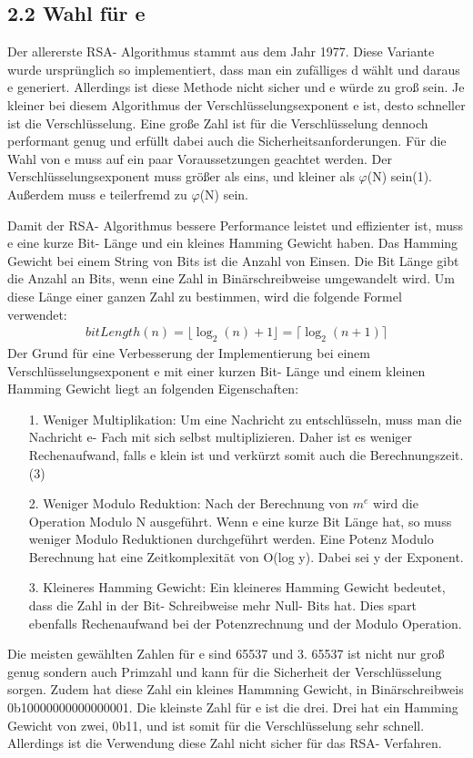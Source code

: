 \documentclass[course=asp]{aspdoc}
\begin{document}
\subsection*{2.2 Wahl für e }
Der allererste RSA- Algorithmus stammt aus dem Jahr 1977. Diese Variante wurde ursprünglich so implementiert, dass man ein zufälliges d wählt und daraus e generiert. Allerdings ist diese Methode nicht sicher und e würde zu groß sein. Je kleiner bei diesem Algorithmus der Verschlüsselungsexponent e ist, desto schneller ist die Verschlüsselung. Eine große Zahl ist für die Verschlüsselung dennoch performant genug und erfüllt dabei auch die Sicherheitsanforderungen. Für die Wahl von e muss auf ein paar Voraussetzungen geachtet werden. Der Verschlüsselungsexponent muss größer als eins, und kleiner als $\varphi $(N) sein(1). Außerdem muss e teilerfremd zu $\varphi $(N) sein.

Damit der RSA- Algorithmus bessere Performance leistet und effizienter ist, muss e eine kurze Bit- Länge und ein kleines Hamming Gewicht haben. Das Hamming Gewicht bei einem String von Bits ist die Anzahl von Einsen. Die Bit Länge gibt die Anzahl an Bits, wenn eine Zahl in Binärschreibweise umgewandelt wird. Um diese Länge einer ganzen Zahl zu bestimmen, wird die folgende Formel verwendet:
\begin{align}
	bitLength(n) = \lfloor \log_{2}(n) + 1 \rfloor = \lceil \log_{2}(n + 1)\rceil
\end{align}
Der Grund für eine Verbesserung der Implementierung bei einem Verschlüsselungsexponent e mit einer kurzen Bit- Länge und einem kleinen Hamming Gewicht liegt an folgenden Eigenschaften:
\begin{itemize}
 \item [1.] Weniger Multiplikation: Um eine Nachricht zu entschlüsseln, muss man die Nachricht e- Fach mit sich selbst multiplizieren. Daher ist es weniger Rechenaufwand, falls e klein ist und verkürzt somit auch die Berechnungszeit.(3)
 \item [2.] Weniger Modulo Reduktion: Nach der Berechnung von $m^{e}$ wird die Operation Modulo N ausgeführt. Wenn e eine kurze Bit Länge hat, so muss weniger Modulo Reduktionen durchgeführt werden. Eine Potenz Modulo Berechnung hat eine Zeitkomplexität von O(log y). Dabei sei y der Exponent.   
 \item [3.] Kleineres Hamming Gewicht: Ein kleineres Hamming Gewicht bedeutet, dass die Zahl in der Bit- Schreibweise mehr Null- Bits hat. Dies spart ebenfalls Rechenaufwand bei der Potenzrechnung und der Modulo Operation.
\end{itemize}
Die meisten gewählten Zahlen für e sind 65537 und 3. 65537 ist nicht nur groß genug sondern auch Primzahl und kann für die Sicherheit der Verschlüsselung sorgen. Zudem hat diese Zahl ein kleines Hammning Gewicht, in Binärschreibweis 0b10000000000000001. Die kleinste Zahl für e ist die drei. Drei hat ein Hamming Gewicht von zwei, 0b11, und ist somit für die Verschlüsselung sehr schnell. Allerdings ist die Verwendung diese Zahl nicht sicher für das RSA- Verfahren. %
\end{document}
